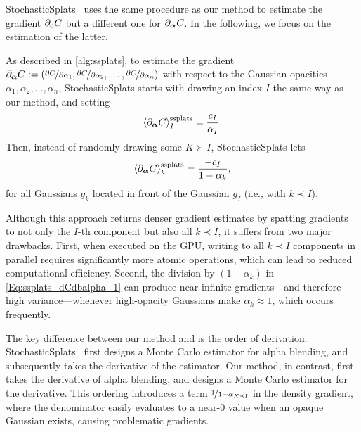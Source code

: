StochasticSplats~\cite{kv2025stochasticsplats} uses the same procedure as our method to estimate the gradient $\partial_{\boldsymbol{c}} C$ but a different one for $\partial_{\boldsymbol{\alpha}} C$.
In the following, we focus on the estimation of the latter.

As described in \autoref{alg:ssplats}, to estimate the gradient $\partial_{\boldsymbol{\alpha}} C := (\nicefrac{\partial C}{\partial\alpha_1}, \nicefrac{\partial C}{\partial\alpha_2}, \ldots, \nicefrac{\partial C}{\partial\alpha_n})$ with respect to the Gaussian opacities $\alpha_1, \alpha_2, \ldots, \alpha_n$, StochasticSplats starts with drawing an index $I$ the same way as our method, and setting
%
\begin{equation}
    \label{Eq:ssplats_dCdbalpha_0}
    \langle \partial_{\boldsymbol{\alpha}} C \rangle^\mathrm{ssplats}_I = \frac{c_I}{\alpha_I}.
\end{equation}
%
Then, instead of randomly drawing some $K \succ I$, StochasticSplats lets
%
\begin{equation}
    \label{Eq:ssplats_dCdbalpha_1}
    \langle \partial_{\boldsymbol{\alpha}} C \rangle^\mathrm{ssplats}_k = \frac{-c_I}{1 - \alpha_k},
\end{equation}
%
for all Gaussians $g_k$ located in front of the Gaussian $g_I$ (i.e., with $k \prec I$).

Although this approach returns denser gradient estimates by spatting gradients to not only the $I$-th component but also all $k \prec I$, it suffers from two major drawbacks.
First, when executed on the GPU, writing to all $k \prec I$ components in parallel requires significantly more atomic operations, which can lead to reduced computational efficiency.
Second, the division by $(1 - \alpha_k)$ in \autoref{Eq:ssplats_dCdbalpha_1} can produce near-infinite gradients---and therefore high variance---whenever high-opacity Gaussians make $\alpha_k \approx 1$, which occurs frequently.






The key difference between our method and \cite{kv2025stochasticsplats} is the order of derivation. StochasticSplats~\cite{kv2025stochasticsplats} first designs a Monte Carlo estimator for alpha blending, and subsequently takes the derivative of the estimator. Our method, in contrast, first takes the derivative of alpha blending, and designs a Monte Carlo estimator for the derivative. This ordering introduces a term $\nicefrac{1}{1-\alpha_{K\prec I}}$ in the density gradient, where the denominator easily evaluates to a near-$0$ value when an opaque Gaussian exists, causing problematic gradients.


